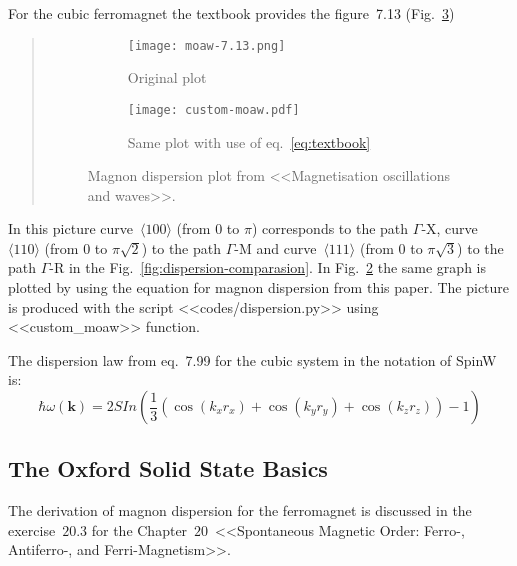     For the cubic ferromagnet the textbook provides the figure~7.13 (Fig.~\ref{fig:moaw-7.13})
    \begin{quote}
        \begin{figure}[H]
            \centering
            \begin{subfigure}[b]{0.49\textwidth}
                \centering
                \texttt{[image: moaw-7.13.png]}
                \caption{Original plot}
                \label{fig:moaw-7.13-original}
            \end{subfigure}
            \hfill
            \begin{subfigure}[b]{0.49\textwidth}
                \centering
                \texttt{[image: custom-moaw.pdf]}
                \caption{Same plot with use of eq.~\eqref{eq:textbook}}
                \label{fig:moaw-7.13-custom}
            \end{subfigure}
            \hfill
            \caption{Magnon dispersion plot from <<Magnetisation oscillations and waves>>.}
            \label{fig:moaw-7.13}
        \end{figure}
    \end{quote}
    In this picture curve~$\langle 100\rangle$ (from $0$ to $\pi$) corresponds to the path $\Gamma$-X, 
    curve~$\langle 110\rangle$ (from $0$ to $\pi\sqrt{2}$) to the path $\Gamma$-M and
    curve~$\langle 111\rangle$ (from $0$ to $\pi\sqrt{3}$) to the path $\Gamma$-R 
    in the Fig.~\ref{fig:dispersion-comparasion}. In Fig.~\ref{fig:moaw-7.13-custom} the same graph is plotted by using the equation for magnon dispersion from this paper. 
    The picture is produced with the script <<codes/dispersion.py>> using <<custom\_moaw>> function.

    The dispersion law from eq.~7.99 for the cubic system in the notation of SpinW is:
    \begin{equation}
        \hbar\omega(\mathbf{k}) = 2SIn\left(\dfrac{1}{3}\left(\cos(k_xr_x) + \cos(k_yr_y) + \cos(k_zr_z)\right) - 1\right)
    \end{equation}

\subsection{The Oxford Solid State Basics \cite{simon2013oxford}}
    The derivation of magnon dispersion for the ferromagnet is discussed in the exercise~$20.3$ for the Chapter~$20$~<<Spontaneous Magnetic Order: Ferro-, Antiferro-, and Ferri-Magnetism>>.

